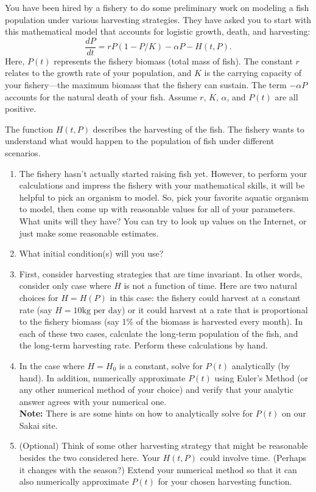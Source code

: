 \documentclass[12pt,letterpaper]{hmcpset}
\begin{document}
\begin{problem}[5]
You have been hired by a fishery to do some preliminary work on
  modeling a fish population under various harvesting strategies.
  They have asked you to start with this mathematical model that
  accounts for logistic growth, death, and harvesting:
\[
\frac {dP}{dt} = r P (1-P/K) - \alpha P - H(t,P).
\]
Here, $P(t)$ represents the fishery biomass (total mass of fish).  The
constant $r$ relates to the growth rate of your population, and $K$ is
the carrying capacity of your fishery---the maximum biomass that the
fishery can sustain. The term $-\alpha P$ accounts for the natural
death of your fish.  Assume $r$, $K$, $\alpha$, and $P(t)$ are all
positive.

The function $H(t,P)$ describes the harvesting of the fish. The fishery
wants to understand what would happen to the population of fish under
different scenarios.

\begin{enumerate}

\item The fishery hasn't actually started raising fish yet.  However,
  to perform your calculations and impress the fishery with your
  mathematical skills, it will be helpful to pick an organism to
  model.  So, pick your favorite aquatic organism to model, then come
  up with reasonable values for all of your parameters.  What units
  will they have? You can try to look up values on the Internet, or
  just make some reasonable estimates.

\item What initial condition(s) will you use?

\item First, consider harvesting strategies that are time invariant.
  In other words, consider only case where $H$ is not a function of
  time. Here are two natural choices for $H=H(P)$ in this case: the
  fishery could harvest at a constant rate (say $H=10 \text{kg per
    day}$) or it could harvest at a rate that is proportional to the
  fishery biomass (say 1\% of the biomass is harvested every month).
  In each of these two cases, calculate the long-term population of
  the fish, and the long-term harvesting rate.  Perform these
  calculations by hand.

\item In the case where $H=H_0$ is a constant, solve for $P(t)$
  analytically (by hand).  In addition, numerically approximate $P(t)$
  using Euler's Method (or any other numerical method of your choice)
  and verify that your analytic answer agrees with your numerical
  one.\\
\textbf{Note:} There is are some hints on how to analytically solve for $P(t)$ on our Sakai site. 

\item (Optional) Think of some other harvesting strategy that might be
  reasonable besides the two considered here.  Your $H(t,P)$ could
  involve time.  (Perhaps it changes with the season?)  Extend your
  numerical method so that it can also numerically approximate $P(t)$
  for your chosen harvesting function.

\end{enumerate}
\end{problem}
\end{document}
